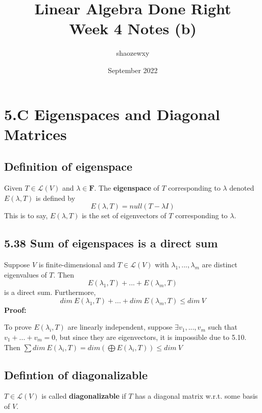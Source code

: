 \documentclass{article}
\title{Linear Algebra Done Right\\
\large{Week 4 Notes (b)}}
\author{shaozewxy }
\date{September 2022}
\begin{document}
\maketitle

\setcounter{secnumdepth}{0}
\section*{5.C Eigenspaces and Diagonal Matrices}
\subsection*{Definition of eigenspace}
Given $T \in \mathcal{L}(V)$ and $\lambda \in \mathbf{F}$. The \textbf{eigenspace} of $T$ corresponding to $\lambda$ denoted $E(\lambda, T)$ is defined by
\begin{equation*}
    E(\lambda, T) = null(T - \lambda I)
\end{equation*}
This is to say, $E(\lambda, T)$ is the set of eigenvectors of $T$ corresponding to $\lambda$.
\subsection*{5.38 Sum of eigenspaces is a direct sum}
Suppose $V$ is finite-dimensional and $T \in \mathcal{L}(V)$ with $\lambda_1, ..., \lambda_m$ are distinct eigenvalues of $T$. Then
\begin{equation*}
    E(\lambda_1, T) + ... + E(\lambda_m, T)
\end{equation*}
is a direct sum. Furthermore,
\begin{equation*}
    dim\ E(\lambda_1, T) + ... + dim\ E(\lambda_m, T) \leq dim\ V
\end{equation*}
\textbf{Proof:}
\begin{addmargin}[1em]{0em}
    To prove $E(\lambda_i, T)$ are linearly independent, suppose $\exists v_1, ..., v_m$ such that $v_1 + ... + v_m = 0$, but since they are eigenvectors, it is impossible due to 5.10.\\
    Then $\sum dim\ E(\lambda_i, T) = dim(\bigoplus E(\lambda_i, T)) \leq dim\ V$
\end{addmargin}
\subsection*{Defintion of diagonalizable}
$T \in \mathcal{L}(V)$ is called \textbf{diagonalizable} if $T$ has a diagonal matrix w.r.t. some basis of $V$.
\end{document}
